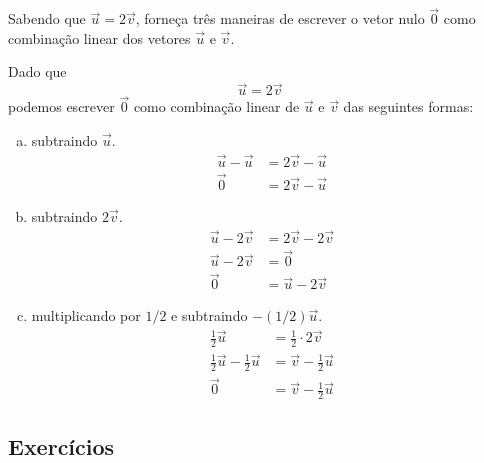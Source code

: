 \begin{exeresol}
  Sabendo que $\vec{u}=2\vec{v}$, forneça três maneiras de escrever o vetor nulo $\vec{0}$ como combinação linear dos vetores $\vec{u}$ e $\vec{v}$.
\end{exeresol}
\begin{resol}
    Dado que
    \begin{equation}
      \vec{u} = 2\vec{v}
    \end{equation}
    podemos escrever $\vec{0}$ como combinação linear de $\vec{u}$ e $\vec{v}$ das seguintes formas:
    \begin{enumerate}[a)]
      \item subtraindo $\vec{u}$.
      \begin{align}
        \vec{u} - \vec{u} &= 2\vec{v} - \vec{u}\\
        \vec{0} &= 2\vec{v}-\vec{u}
      \end{align}
      \item subtraindo $2\vec{v}$.
      \begin{align}
        \vec{u} - 2\vec{v} &= 2\vec{v} - 2\vec{v}\\
        \vec{u} - 2\vec{v} &= \vec{0}\\
        \vec{0} & = \vec{u} - 2\vec{v}
      \end{align}
      \item multiplicando por $1/2$ e subtraindo $-(1/2)\vec{u}$.
      \begin{align}
        \frac{1}{2}\vec{u} &= \frac{1}{2}\cdot 2\vec{v}\\
        \frac{1}{2}\vec{u} - \frac{1}{2}\vec{u} &= \vec{v} - \frac{1}{2}\vec{u}\\
        \vec{0} &= \vec{v}-\frac{1}{2}\vec{u}
      \end{align}
    \end{enumerate}
  \end{resol}

\subsection{Exercícios}

